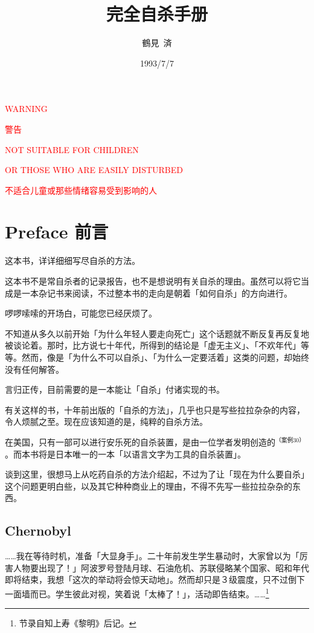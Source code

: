 \documentclass[UTF8]{ctexart}
\title{完全自杀手册}
\author{鶴見\ 済}
\date{1993/7/7}
\begin{document}
\centerline{\large{\textcolor{red}{WARNING}}}
\centerline{\large{\textcolor{red}{警告}}}

\centerline{\textcolor{red}{NOT SUITABLE FOR CHILDREN }}
\centerline{\textcolor{red}{OR THOSE WHO ARE EASILY DISTURBED}}
\centerline{\textcolor{red}{不适合儿童或那些情绪容易受到影响的人}}


\newpage

\maketitle

\newpage
\tableofcontents
\newpage

\section{Preface 前言}

这本书，详详细细写尽自杀的方法。

这本书不是常自杀者的记录报告，也不是想说明有关自杀的理由。虽然可以将它当成是一本杂记书来阅读，不过整本书的走向是朝着「如何自杀」的方向进行。

啰啰嗦嗦的开场白，可能您已经厌烦了。

不知道从多久以前开始「为什么年轻人要走向死亡」这个话题就不断反复再反复地被谈论着。那时，比方说七十年代，所得到的结论是「虚无主义」、「不欢年代」等等。然而，像是「为什么不可以自杀」、「为什么一定要活着」这类的问题，却始终没有任何解答。

言归正传，目前需要的是一本能让「自杀」付诸实现的书。

有关这样的书，十年前出版的「自杀的方法」，几乎也只是写些拉拉杂杂的内容，令人烦腻之至。现在应该知道的是，纯粹的自杀方法。

在美国，只有一部可以进行安乐死的自杀装置，是由一位学者发明创造的$^{（案例 30）}$。而本书将是日本唯一的一本「以语言文字为工具的自杀装置」。

谈到这里，很想马上从吃药自杀的方法介绍起，不过为了让「现在为什么要自杀」这个问题更明白些，以及其它种种商业上的理由，不得不先写一些拉拉杂杂的东西。

\subsection{Chernobyl}

……我在等待时机，准备「大显身手」。二十年前发生学生暴动时，大家曾以为「厉害人物要出现了！」阿波罗号登陆月球、石油危机、苏联侵略某个国家、昭和年代即将结束，我想「这次的举动将会惊天动地」。然而却只是３级震度，只不过倒下一面墙而已。学生彼此对视，笑着说「太棒了！」，活动即告结束。……\footnote{节录自知上寿《黎明》后记。}
\end{document}
